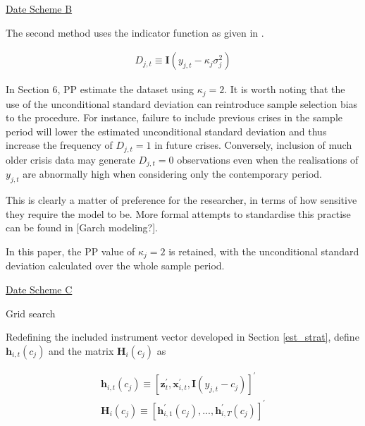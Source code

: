 \documentclass[../base.tex]{subfiles}
\begin{document}
\underline{Date Scheme B}

The second method uses the indicator function as given in \cite{pesaran2007econometric}.

\begin{align}
	D_{j, t} \equiv \mathbf{I}(y_{j,t} - \kappa_j \sigma^2_{j})
\end{align}

In Section 6, PP estimate the \cite{eichengreen1996contagious} dataset using $\kappa_j = 2$. It is worth noting that the use of the unconditional standard deviation can reintroduce sample selection bias to the procedure. For instance, failure to include previous crises in the sample period will lower the estimated unconditional standard deviation and thus increase the frequency of $D_{j,t} = 1$ in future crises. Conversely, inclusion of much older crisis data may generate $D_{j,t} = 0$ observations even when the realisations of $y_{j,t}$ are abnormally high when considering only the contemporary period. 

This is clearly a matter of preference for the researcher, in terms of how sensitive they require the model to be. More formal attempts to standardise this practise can be found in [Garch modeling?]. 

In this paper, the PP value of $\kappa_j = 2$ is retained, with the unconditional standard deviation calculated over the whole sample period.

\underline{Date Scheme C}

Grid search

Redefining the included instrument vector developed in Section \ref{est_strat}, define $\mathbf{h}_{i,t}(c_j)$ and the matrix $\mathbf{H}_{i}(c_j)$ as

\begin{align}
	\mathbf{h}_{i,t}(c_j) \equiv [\mathbf{z}_{t}^{\prime}, \mathbf{x}_{i,t}^{\prime}, \mathbf{I}(y_{j,t} - c_j)]^\prime \\
	\mathbf{H}_i(c_j) \equiv [\mathbf{h}_{i,1}^{\prime}(c_j), ... , \mathbf{h}_{i,T}^{\prime}(c_j)]^{\prime}
\end{align}




\end{document}
